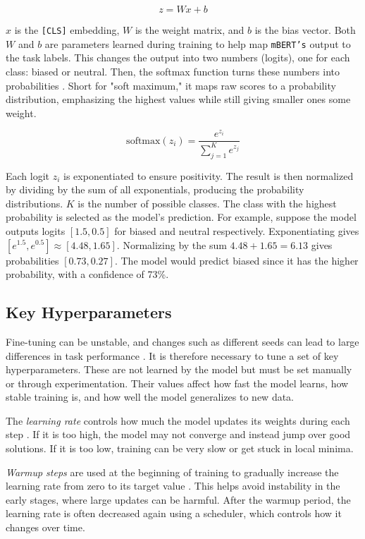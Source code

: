     \[
    z = Wx + b
    \]

   \(x\) is the \texttt{[CLS]} embedding, \(W\) is the weight matrix, and \(b\) is the bias vector. Both \(W\) and \(b\) are parameters learned during training to help map \texttt{mBERT’s} output to the task labels. This changes the output into two numbers (logits), one for each class: biased or neutral. Then, the softmax function turns these numbers into probabilities \parencite{devlinBERTPretrainingDeep2019,xiaoIntroductionTransformersNLP2023}. Short for "soft maximum," it maps raw scores to a probability distribution, emphasizing the highest values while still giving smaller ones some weight.

    \[
    \text{softmax}(z_i) = \frac{e^{z_i}}{\sum_{j=1}^{K} e^{z_j}}
    \]

    Each logit \( z_i \) is exponentiated to ensure positivity. The result is then normalized by dividing by the sum of all exponentials, producing the probability distributions. \( K \) is the number of possible classes. The class with the highest probability is selected as the model’s prediction. For example, suppose the model outputs logits $[1.5, 0.5]$ for biased and neutral respectively. Exponentiating gives $[e^{1.5}, e^{0.5}] \approx [4.48, 1.65]$. Normalizing by the sum $4.48 + 1.65 = 6.13$ gives probabilities $[0.73, 0.27]$. The model would predict biased since it has the higher probability, with a confidence of 73\%.

    
\subsection{Key Hyperparameters} \label{subsection:hyperparameters_explained}
    Fine-tuning can be unstable, and changes such as different seeds can lead to large differences in task performance \parencite{mosbachStabilityFinetuningBERT2021}. It is therefore necessary to tune a set of key hyperparameters. These are not learned by the model but must be set manually or through experimentation. Their values affect how fast the model learns, how stable training is, and how well the model generalizes to new data.

    The \textit{learning rate} controls how much the model updates its weights during each step \parencite{mosbachStabilityFinetuningBERT2021}. If it is too high, the model may not converge and instead jump over good solutions. If it is too low, training can be very slow or get stuck in local minima.

    \textit{Warmup steps} are used at the beginning of training to gradually increase the learning rate from zero to its target value \parencite{mosbachStabilityFinetuningBERT2021}. This helps avoid instability in the early stages, where large updates can be harmful. After the warmup period, the learning rate is often decreased again using a scheduler, which controls how it changes over time.

